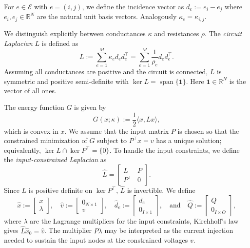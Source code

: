 \documentclass[final, 11pt, nonatbib]{elsarticle}
\theoremstyle{definition}
\theoremstyle{plain}
\numberwithin{equation}{section}
\begin{document}
For $e \in \mathcal{E}$ with $e = (i,j)$, we define the incidence vector as $d_e:=e_{i} -e_{j}$ where $e_i,e_j \in  \mathbb{R}^N$ are the natural unit basis vectors. Analogously $\kappa_e = \kappa_{i,j}$.

We distinguish explicitly between conductances $\kappa$ and resistances $\rho$. The \textit{circuit Laplacian} $L$ is defined as
\begin{equation}
    L :=\sum_{e=1}^{M}\kappa_ed_ed_e^\top = \sum_{e=1}^{M}\dfrac{1}{\rho_e}d_ed_e^\top.
    \label{The_Laplacian}
\end{equation}
Assuming all conductances are positive and the circuit is connected, $L$ is symmetric and positive semi-definite with $\ker L = \operatorname{span}\{\mathbf{1}\}$. Here $\mathbf{1} \in \mathbb{R}^{N}$ is the vector of all ones.

The energy function $G$ is given by
\[ G(x ; \kappa) := \dfrac{1}{2}\langle x, Lx\rangle,\]
which is convex in $x$. We assume that the input matrix $P$ is chosen so that the constrained minimization of $G$ subject to $P^\top x = v$ has a unique solution; equivalently, $\ker L \cap \ker P^\top = \{0\}$. To handle the input constraints, we define the \textit{input-constrained Laplacian} as
\begin{equation}
    \hat{L} = \begin{bmatrix}
        L & P \\ P^\top & 0
    \end{bmatrix}.
    \label{eq:hat-L}
\end{equation}
Since $L$ is positive definite on $\ker P^\top$, $\hat{L}$ is invertible. We define  $$\hat{x} := \begin{bmatrix}x \\ \lambda\end{bmatrix}, \quad  \hat{v} := \begin{bmatrix}0_{N \times 1} \\ v\end{bmatrix}, \quad \hat{d}_e := \begin{bmatrix}d_e \\ 0_{I \times 1}\end{bmatrix}, \quad \text{and} \quad \hat{Q}:= \begin{bmatrix} Q \\ 0_{I \times O}\end{bmatrix},$$ where $\lambda$ are the Lagrange multipliers for the input constraints, Kirchhoff's law gives $\hat{L}\hat{x}_0 = \hat{v}$. The multiplier $P\lambda$ may be interpreted as the current injection needed to sustain the input nodes at the constrained voltages $v$. 
\end{document}
